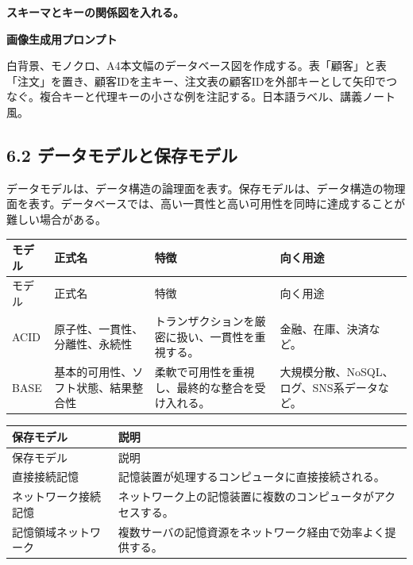 \documentclass[a4paper,11pt]{ltjsarticle}
\begin{document}
\begin{todobox}
\textbf{スキーマとキーの関係図を入れる。}\par
\textbf{画像生成用プロンプト}\par
白背景、モノクロ、A4本文幅のデータベース図を作成する。表「顧客」と表「注文」を置き、顧客IDを主キー、注文表の顧客IDを外部キーとして矢印でつなぐ。複合キーと代理キーの小さな例を注記する。日本語ラベル、講義ノート風。

\end{todobox}

\subsection{6.2 データモデルと保存モデル}

データモデルは、データ構造の論理面を表す。保存モデルは、データ構造の物理面を表す。データベースでは、高い一貫性と高い可用性を同時に達成することが難しい場合がある。

\begin{longtable}{>{\raggedright\arraybackslash}p{}>{\raggedright\arraybackslash}p{}>{\raggedright\arraybackslash}p{}>{\raggedright\arraybackslash}p{}}
\toprule
モデル & 正式名 & 特徴 & 向く用途 \\
\midrule
\endfirsthead
\toprule
モデル & 正式名 & 特徴 & 向く用途 \\
\midrule
\endhead
ACID & 原子性、一貫性、分離性、永続性 & トランザクションを厳密に扱い、一貫性を重視する。 & 金融、在庫、決済など。 \\
BASE & 基本的可用性、ソフト状態、結果整合性 & 柔軟で可用性を重視し、最終的な整合を受け入れる。 & 大規模分散、NoSQL、ログ、SNS系データなど。 \\
\bottomrule
\end{longtable}

\begin{longtable}{>{\raggedright\arraybackslash}p{}>{\raggedright\arraybackslash}p{}}
\toprule
保存モデル & 説明 \\
\midrule
\endfirsthead
\toprule
保存モデル & 説明 \\
\midrule
\endhead
直接接続記憶 & 記憶装置が処理するコンピュータに直接接続される。 \\
ネットワーク接続記憶 & ネットワーク上の記憶装置に複数のコンピュータがアクセスする。 \\
記憶領域ネットワーク & 複数サーバの記憶資源をネットワーク経由で効率よく提供する。 \\
\bottomrule
\end{longtable}
\end{document}
